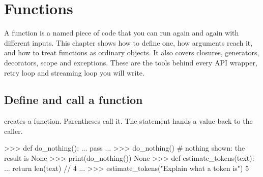 \chapter{Functions}

A function is a named piece of code that you can run again and again with different inputs.
This chapter shows how to define one, how arguments reach it, and how to treat functions as
ordinary objects. It also covers closures, generators, decorators, scope and exceptions.
These are the tools behind every API wrapper, retry loop and streaming loop you will write.


\section{Define and call a function}

 creates a function. Parentheses call it. The  statement hands a value
back to the caller.

\begin{center}
\end{center}

\begin{pycode}
>>> def do_nothing():
...     pass
...
>>> do_nothing()          # nothing shown: the result is None
>>> print(do_nothing())
None
>>> def estimate_tokens(text):
...     return len(text) // 4
...
>>> estimate_tokens("Explain what a token is")
5
\end{pycode}

